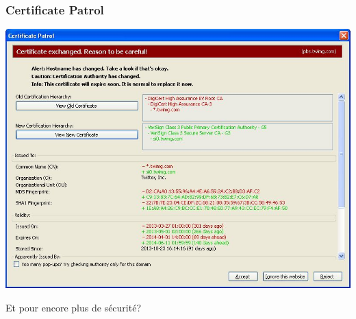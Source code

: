 \documentclass{beamer}
\begin{document}
\begin{frame}
\frametitle{Certificate Patrol}
\begin{center}
\includegraphics[scale=0.5] {./images/Certificate_Patrol_certifcat_a_change.jpg}
\end{center}
\end{frame}


\begin{frame}
\begin{center}
\Huge{Et pour encore plus de sécurité?}
\end{center}
\end{frame}
\end{document}
